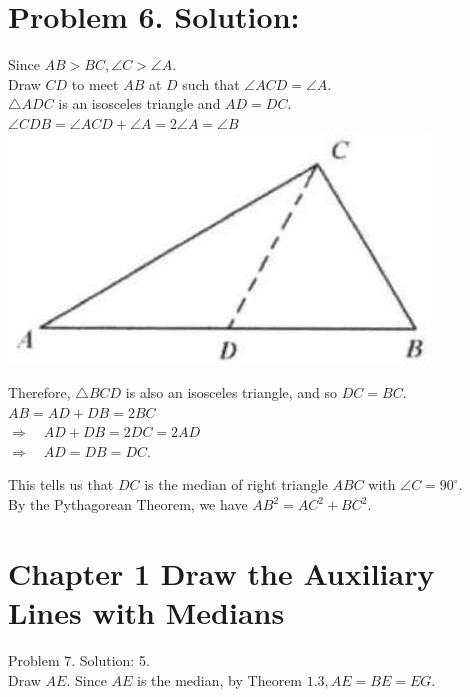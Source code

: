 \documentclass[10pt]{article}
\begin{document}
\section*{Problem 6. Solution:}
Since \(A B>B C, \angle C>\angle A\).\\
Draw \(C D\) to meet \(A B\) at \(D\) such that \(\angle A C D=\angle A\).\\
\(\triangle A D C\) is an isosceles triangle and \(A D=D C\).\\
\(\angle C D B=\angle A C D+\angle A=2 \angle A=\angle B\)\\
\includegraphics[max width=\textwidth, center]{2025_04_17_97bc1f7e44d93c271a88g-019(1)}

Therefore, \(\triangle B C D\) is also an isosceles triangle, and so \(D C=B C\).\\
\(A B=A D+D B=2 B C\)\\
\(\Rightarrow \quad A D+D B=2 D C=2 A D\)\\
\(\Rightarrow \quad A D=D B=D C\).

This tells us that \(D C\) is the median of right triangle \(A B C\) with \(\angle C=90^{\circ}\).\\
By the Pythagorean Theorem, we have \(A B^{2}=A C^{2}+B C^{2}\).

\section*{Chapter 1 Draw the Auxiliary Lines with Medians}
Problem 7. Solution: 5.\\
Draw \(A E\). Since \(A E\) is the median, by Theorem \(1.3, A E=B E=E G\).
\end{document}
